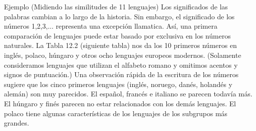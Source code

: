 \documentclass[a4paper, 20pt]{article}
\begin{document}
Ejemplo (Midiendo las similitudes de 11 lenguajes) Los significados de las palabras cambian a lo largo de la historia. Sin embargo, el significado de los números 1,2,3,... representa una excepción llamatica. Así, una primera comparación de lenguajes puede estar basado por exclusiva en los números naturales. La Tabla 12.2 (siguiente tabla) nos da los 10 primeros números en inglés, polaco, húngaro y otros ocho lenguajes europeos modernos. (Solamente consideramos lenguajes que utilizan el alfabeto romano y omitimos acentos y signos de puntuación.) Una observación rápida de la escritura de los números sugiere que los cinco primeros lenguajes (inglés, noruego, danés, holandés y alemán) son muy parecidos. El español, francés e italiano se parecen todavía más. El húngaro y finés parecen no estar relacionados con los demás lenguajes. El polaco tiene algunas características de los lenguajes de los subgrupos más grandes.
\end{document}
